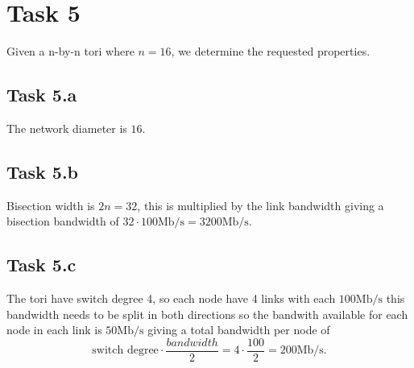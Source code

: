 \section{Task 5}
Given a n-by-n tori where $n=16$, we determine the requested properties.

\subsection{Task 5.a}
The network diameter is $16$.


\subsection{Task 5.b}
Bisection width is $2n = 32$, this is multiplied by the link bandwidth giving a
bisection bandwidth of $32 \cdot 100\text{Mb/s} = 3200\text{Mb/s}$.

\subsection{Task 5.c}
The tori have switch degree 4, so each node have 4 links with each
$100\text{Mb/s}$ this bandwidth needs to be split in both directions so the
bandwith available for each node in each link is $50\text{Mb/s}$ giving a total
bandwidth per node of
\[
\text{switch degree} \cdot \frac{bandwidth}{2} = 4 \cdot
\frac{100}{2} = 200\text{Mb/s}.
\]
